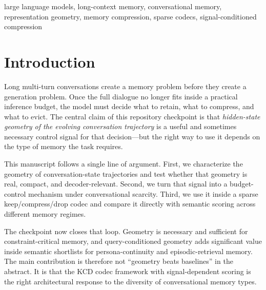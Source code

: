 \documentclass[conference]{IEEEtran}
\begin{document}
\begin{IEEEkeywords}
large language models, long-context memory, conversational memory, representation geometry, memory compression, sparse codecs, signal-conditioned compression
\end{IEEEkeywords}

\section{Introduction}
Long multi-turn conversations create a memory problem before they create a generation problem. Once the full dialogue no longer fits inside a practical inference budget, the model must decide what to retain, what to compress, and what to evict. The central claim of this repository checkpoint is that \emph{hidden-state geometry of the evolving conversation trajectory} is a useful and sometimes necessary control signal for that decision---but the right way to use it depends on the type of memory the task requires.

This manuscript follows a single line of argument. First, we characterize the geometry of conversation-state trajectories and test whether that geometry is real, compact, and decoder-relevant. Second, we turn that signal into a budget-control mechanism under conversational scarcity. Third, we use it inside a sparse keep/compress/drop codec and compare it directly with semantic scoring across different memory regimes.

The checkpoint now closes that loop. Geometry is necessary and sufficient for constraint-critical memory, and query-conditioned geometry adds significant value inside semantic shortlists for persona-continuity and episodic-retrieval memory. The main contribution is therefore not ``geometry beats baselines'' in the abstract. It is that the KCD codec framework with signal-dependent scoring is the right architectural response to the diversity of conversational memory types.
\end{document}
